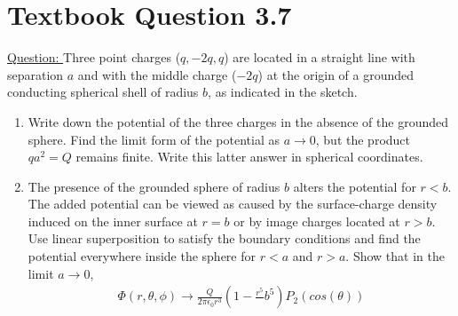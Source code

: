 \documentclass[12pt]{article}
\begin{document}
\newpage
\section{Textbook Question 3.7} \label{section2}
    \underline{Question: }
    Three point charges ($q, -2q, q$) are located in a straight line with separation $a$ and with the middle charge ($-2q$) at the origin of a grounded conducting spherical shell of radius $b$, as indicated in the sketch. 
    \begin{enumerate}
        \item [a)] Write down the potential of the three charges in the absence of the grounded sphere. Find the limit form of the potential as $a \rightarrow{} 0$, but the product $qa^2 = Q$ remains finite. Write this latter answer in spherical coordinates.
        \item [b)] The presence of the grounded sphere of radius $b$ alters the potential for $r<b$. The added potential can be viewed as caused by the surface-charge density induced on the inner surface at $r=b$ or by image charges located at $r>b$. Use linear superposition to satisfy the boundary conditions and find the potential everywhere inside the sphere for $r<a$ and $r>a$. Show that in the limit $a \rightarrow{} 0$, 
        \begin{gather*}
            \Phi(r,\theta, \phi) \rightarrow{} \frac{Q}{2 \pi \epsilon_0 r^3} \left(1 - \frac{r^5}{}b^5 \right) P_2(cos(\theta))
        \end{gather*}
    \end{enumerate}
    
\end{document}

